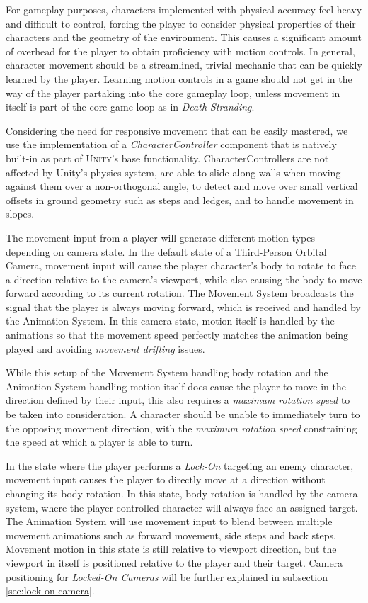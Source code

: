 For gameplay purposes, characters implemented with physical accuracy feel heavy and difficult to control, forcing the player to consider  physical properties of their characters and the geometry of the environment. This causes a significant amount of overhead for the player to obtain proficiency with motion controls. In general, character movement should be a streamlined, trivial mechanic that can be quickly learned by the player. Learning motion controls in a game should not get in the way of the player partaking into the core gameplay loop, unless movement in itself is part of the core game loop as in \emph{Death Stranding}.

Considering the need for responsive movement that can be easily mastered, we use the implementation of a \emph{CharacterController} component that is natively built-in as part of \textsc{Unity}'s base functionality. CharacterControllers are not affected by Unity's physics system, are able to slide along walls when moving against them over a non-orthogonal angle, to detect and move over small vertical offsets in ground geometry such as steps and ledges, and to handle movement in slopes.

The movement input from a player will generate different motion types depending on camera state. In the default state of a Third-Person Orbital Camera, movement input will cause the player character's body to rotate to face a direction relative to the camera's viewport, while also causing the body to move forward according to its current rotation. The Movement System broadcasts the signal that the player is always moving forward, which is received and handled by the Animation System. In this camera state, motion itself is handled by the animations so that the movement speed perfectly matches the animation being played and avoiding \emph{movement drifting} issues.

While this setup of the Movement System handling body rotation and the Animation System handling motion itself does cause the player to move in the direction defined by their input, this also requires a \emph{maximum rotation speed} to be taken into consideration. A character should be unable to immediately turn to the opposing movement direction, with the \emph{maximum rotation speed} constraining the speed at which a player is able to turn.

In the state where the player performs a \emph{Lock-On} targeting an enemy character, movement input causes the player to directly move at a direction without changing its body rotation. In this state, body rotation is handled by the camera system, where the player-controlled character will always face an assigned target. The Animation System will use movement input to blend between multiple movement animations such as forward movement, side steps and back steps. Movement motion in this state is still relative to viewport direction, but the viewport in itself is positioned relative to the player and their target. Camera positioning for \emph{Locked-On Cameras} will be further explained in subsection \ref{sec:lock-on-camera}.

